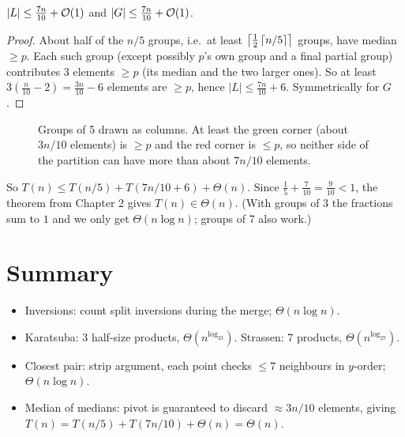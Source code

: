 \begin{lemma}
$|L|\le \frac{7n}{10}+\mathcal{O}(1)$ and $|G|\le\frac{7n}{10}+\mathcal{O}(1)$.
\end{lemma}
\begin{proof}
About half of the $n/5$ groups, i.e.\ at least $\left\lceil \frac12\left\lceil n/5 \right\rceil \right\rceil$ groups, have median $\ge p$.
Each such group (except possibly $p$'s own group and a final partial group) contributes 3 elements $\ge p$
(its median and the two larger ones). So at least $3(\frac{n}{10}-2)=\frac{3n}{10}-6$ elements are $\ge p$,
hence $|L|\le\frac{7n}{10}+6$. Symmetrically for $G$.
\end{proof}

\begin{figure}[H]
\centering
{}
\caption{Groups of 5 drawn as columns. At least the green corner (about
$3n/10$ elements) is $\ge p$ and the red corner is $\le p$, so neither side
of the partition can have more than about $7n/10$ elements.}
\end{figure}

So $T(n)\le T(n/5)+T(7n/10+6)+\Theta(n)$. Since $\frac15+\frac7{10}=\frac9{10}<1$, the theorem from Chapter 2 gives
$T(n)\in\Theta(n)$. (With groups of 3 the fractions sum to $1$ and we only get $\Theta(n\log n)$; groups of 7 also work.)

\section*{Summary}
\begin{itemize}
  \item Inversions: count split inversions during the merge; $\Theta(n\log n)$.
  \item Karatsuba: 3 half-size products, $\Theta(n^{\log_23})$. Strassen: 7 products, $\Theta(n^{\log_27})$.
  \item Closest pair: strip argument, each point checks $\le7$ neighbours in $y$-order; $\Theta(n\log n)$.
  \item Median of medians: pivot is guaranteed to discard $\approx 3n/10$ elements, giving $T(n)=T(n/5)+T(7n/10)+\Theta(n)=\Theta(n)$.
\end{itemize}
